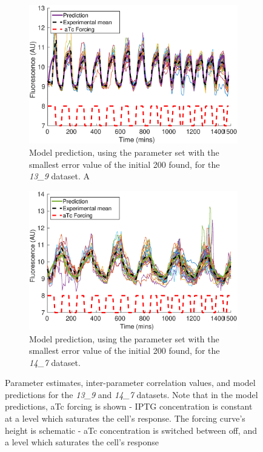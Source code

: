 \documentclass[10pt,journal]{./IEEE_latex_class/IEEEtran}
\begin{document}
\begin{figure}
    \begin{subfigure}[c]{0.49\textwidth}
    \centering
    \includegraphics[scale = 0.37]{13_9_bestPlot}
        \caption{Model prediction, using the parameter set with the smallest error value of the initial 200 found, for the \textit{13\_9} dataset. A}
    \end{subfigure}
    \begin{subfigure}[c]{0.49\textwidth}
    \centering
        \includegraphics[scale = 0.37]{14_7_bestPlot}
        \caption{Model prediction, using the parameter set with the smallest error value of the initial 200 found, for the \textit{14\_7} dataset.}
    \end{subfigure}
    \caption{Parameter estimates, inter-parameter correlation values, and model predictions for the \textit{13\_9} and \textit{14\_7} datasets. Note that in the model predictions, aTc forcing is shown - IPTG concentration is constant at a level which saturates the cell's response. The forcing curve's height is schematic - aTc concentration is switched between off, and a level which saturates the cell's response}
\label{InitialResults}
\end{figure} 
 
\end{document}
